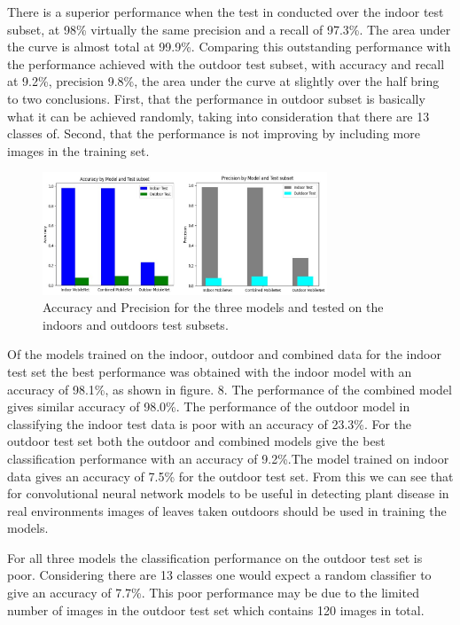 \documentclass[conference]{IEEEtran}
\begin{document}
There is a superior performance when the test in conducted over the indoor test subset, at 98\% virtually the same precision and a recall of 97.3\%. The area under the curve is almost total at 99.9\%. Comparing this outstanding performance with the performance achieved with the outdoor test subset, with accuracy and recall at 9.2\%, precision 9.8\%, the area under the curve at slightly over the half bring to two conclusions. First, that the performance in outdoor subset is basically what it can be achieved randomly, taking into consideration that there are 13 classes of. Second, that the performance is not improving by including more images in the training set. 



\begin{figure}[htbp]
\centerline{\includegraphics[width=8.5cm]{resultsPrecAccdifferentTests.png}}
\caption{Accuracy and Precision for the three models and tested on the indoors and outdoors test subsets.}
\label{fig}
\end{figure}
Of the models trained on the indoor, outdoor and combined data for the indoor test set the best performance was obtained with the indoor model with an accuracy of 98.1\%, as shown in figure. 8. The performance of the combined model gives similar accuracy of 98.0\%. The performance of the outdoor model in classifying the indoor test data is poor with an accuracy of 23.3\%. For the outdoor test set both the outdoor and combined models give the best classification performance with an accuracy of 9.2\%.The model trained on indoor data gives an accuracy of 7.5\% for the outdoor test set. From this we can see that for convolutional neural network models to be useful in detecting plant disease in real environments images of leaves taken outdoors should be used in training the models. \

For all three models the classification performance on the outdoor test set is poor. Considering there are 13 classes one would expect a random classifier to give an accuracy of 7.7\%. This poor performance may be due to the limited number of images in the outdoor test set which contains 120 images in total. \
\end{document}
